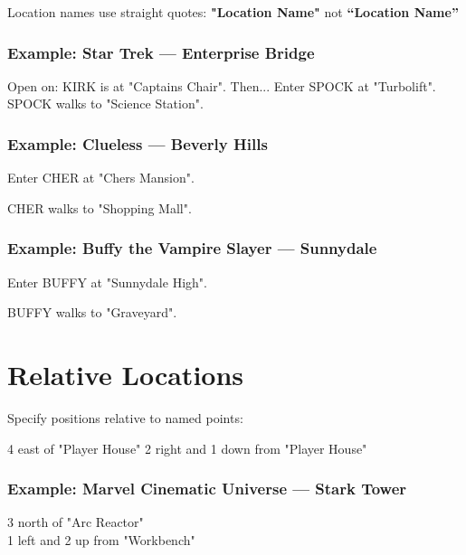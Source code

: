 \documentclass[11pt,letterpaper,oldstylefigures]{memoir}
\newcommand{\stagedir}[1]{#1\par\vspace{1\baselineskip}}
\newenvironment{FountainExample}
  {\begingroup
  \ttfamily\small
   \setlength{\parindent}{0pt}
  \setlength{\parskip}{0.5em}
  \allowdisplaybreaks
  \setlength{\displaywidowpenalty}{0}
  \setlength{\widowpenalty}{0}
  \setlength{\clubpenalty}{0}
  \setlength{\interlinepenalty}{0}
}
  {\endgroup}
\newcommand{\fountain}[1]{\textbf{#1}}
\begin{document}
Location names use straight quotes: \fountain{"Location Name"} not \fountain{``Location Name''}

\subsubsection{Example: Star Trek — Enterprise Bridge}

\begin{FountainExample}
\stagedir{Open on: KIRK is at "Captains Chair". Then... Enter SPOCK at "Turbolift".
SPOCK walks to "Science Station".}
\end{FountainExample}

\subsubsection{Example: Clueless — Beverly Hills}
\begin{FountainExample}
\stagedir{Enter CHER at "Chers Mansion".}
\stagedir{CHER walks to "Shopping Mall".}
\end{FountainExample}

\subsubsection{Example: Buffy the Vampire Slayer — Sunnydale}
\begin{FountainExample}
\stagedir{Enter BUFFY at "Sunnydale High".}
\stagedir{BUFFY walks to "Graveyard".}
\end{FountainExample}

\section{Relative Locations}

Specify positions relative to named points:

\begin{FountainExample}
4 east of "Player House"
2 right and 1 down from "Player House"
\end{FountainExample}

\subsubsection{Example: Marvel Cinematic Universe — Stark Tower}
\begin{FountainExample}
3 north of "Arc Reactor"\\
1 left and 2 up from "Workbench"
\end{FountainExample}
\end{document}
